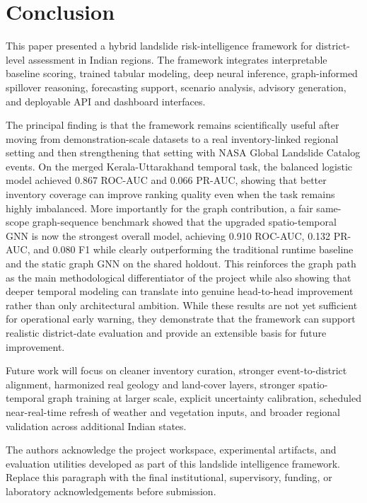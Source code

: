 \documentclass[pdflatex,sn-mathphys-num]{sn-jnl}
\begin{document}
\section{Conclusion}

This paper presented a hybrid landslide risk-intelligence framework for district-level assessment in Indian regions. The framework integrates interpretable baseline scoring, trained tabular modeling, deep neural inference, graph-informed spillover reasoning, forecasting support, scenario analysis, advisory generation, and deployable API and dashboard interfaces.

The principal finding is that the framework remains scientifically useful after moving from demonstration-scale datasets to a real inventory-linked regional setting and then strengthening that setting with NASA Global Landslide Catalog events. On the merged Kerala-Uttarakhand temporal task, the balanced logistic model achieved 0.867 ROC-AUC and 0.066 PR-AUC, showing that better inventory coverage can improve ranking quality even when the task remains highly imbalanced. More importantly for the graph contribution, a fair same-scope graph-sequence benchmark showed that the upgraded spatio-temporal GNN is now the strongest overall model, achieving 0.910 ROC-AUC, 0.132 PR-AUC, and 0.080 F1 while clearly outperforming the traditional runtime baseline and the static graph GNN on the shared holdout. This reinforces the graph path as the main methodological differentiator of the project while also showing that deeper temporal modeling can translate into genuine head-to-head improvement rather than only architectural ambition. While these results are not yet sufficient for operational early warning, they demonstrate that the framework can support realistic district-date evaluation and provide an extensible basis for future improvement.

Future work will focus on cleaner inventory curation, stronger event-to-district alignment, harmonized real geology and land-cover layers, stronger spatio-temporal graph training at larger scale, explicit uncertainty calibration, scheduled near-real-time refresh of weather and vegetation inputs, and broader regional validation across additional Indian states.

\backmatter


The authors acknowledge the project workspace, experimental artifacts, and evaluation utilities developed as part of this landslide intelligence framework. Replace this paragraph with the final institutional, supervisory, funding, or laboratory acknowledgements before submission.
\end{document}
